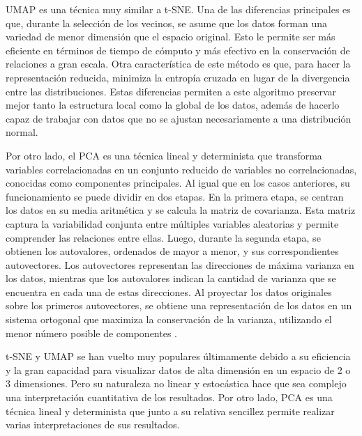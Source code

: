 UMAP es una técnica muy similar a t-SNE. Una de las diferencias principales es que, durante la selección de los vecinos, se asume que los datos forman una variedad de menor dimensión que el espacio original. Esto le permite ser más eficiente en términos de tiempo de cómputo y más efectivo en la conservación de relaciones a gran escala. Otra característica de este método es que, para hacer la representación reducida, minimiza la entropía cruzada en lugar de la divergencia entre las distribuciones. Estas diferencias permiten a este algoritmo preservar mejor tanto la estructura local como la global de los datos, además de hacerlo capaz de trabajar con datos que no se ajustan necesariamente a una distribución normal. \cite{McInnes2018, Becht_2018}

Por otro lado, el PCA es una técnica lineal y determinista que transforma variables correlacionadas en un conjunto reducido de variables no correlacionadas, conocidas como componentes principales. Al igual que en los casos anteriores, su funcionamiento se puede dividir en dos etapas. En la primera etapa, se centran los datos en su media aritmética y se calcula la matriz de covarianza. Esta matriz captura la variabilidad conjunta entre múltiples variables aleatorias y permite comprender las relaciones entre ellas. Luego, durante la segunda etapa, se obtienen los autovalores, ordenados de mayor a menor, y sus correspondientes autovectores. Los autovectores representan las direcciones de máxima varianza en los datos, mientras que los autovalores indican la cantidad de varianza que se encuentra en cada una de estas direcciones. Al proyectar los datos originales sobre los primeros autovectores, se obtiene una representación de los datos en un sistema ortogonal que maximiza la conservación de la varianza, utilizando el menor número posible de componentes \cite{Lever2017}.

t-SNE y UMAP se han vuelto muy populares últimamente debido a su eficiencia y la gran capacidad para visualizar datos de alta dimensión en un espacio de 2 o 3 dimensiones. Pero su naturaleza no linear y estocástica hace que sea complejo una interpretación cuantitativa de los resultados. Por otro lado, PCA es una técnica lineal y determinista que junto a su relativa sencillez permite realizar varias interpretaciones de sus resultados.

